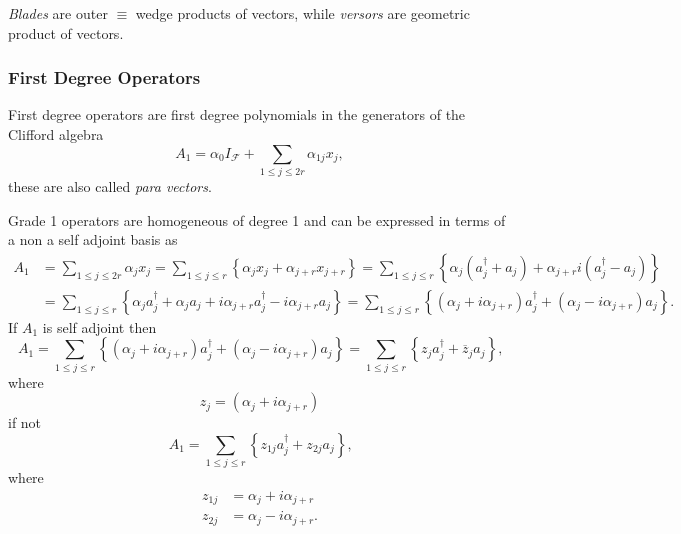 \documentclass[aps, preprint]{revtex4}
\begin{document}
\emph{Blades} are outer $ \equiv $ wedge products of vectors, while \emph{versors} are geometric product of vectors. 

\subsubsection{First Degree Operators}
First degree operators are first degree polynomials in the generators of the Clifford algebra
\begin{equation*}A_{1} =\alpha _{0} I_{\mathcal{F}} +\sum _{1 \leq j \leq 2 r}\alpha _{1 j} x_{j} ,
\end{equation*}these are also called \emph{para vectors}. 

Grade 1 operators are homogeneous of
degree 1 and can be expressed in terms of a non a self adjoint basis as
\begin{align}A_{1} &  =\sum _{1 \leq j \leq 2 r}\alpha _{j} x_{j} =\sum _{1 \leq j \leq r}\left \{\alpha _{j} x_{j} +\alpha _{j +r} x_{j +r}\right \} =\sum _{1 \leq j \leq r}\left \{\alpha _{j} \left (a_{j}^{ \dag } +a_{j}\right ) +\alpha _{j +r} i \left (a_{j}^{ \dag } -a_{j}\right )\right \} \nonumber  \\
 &  =\sum _{1 \leq j \leq r}\left \{\alpha _{j} a_{j}^{ \dag } +\alpha _{j} a_{j} +i \alpha _{j +r} a_{j}^{ \dag } -i \alpha _{j +r} a_{j}\right \} =\sum _{1 \leq j \leq r}\left \{\left (\alpha _{j} +i \alpha _{j +r}\right ) a_{j}^{ \dag } +\left (\alpha _{j} -i \alpha _{j +r}\right ) a_{j}\right \}\text{.}\end{align}If $A_{1}$ is self adjoint then
\begin{equation}A_{1} =\sum _{1 \leq j \leq r}\left \{\left (\alpha _{j} +i \alpha _{j +r}\right ) a_{j}^{ \dag } +\left (\alpha _{j} -i \alpha _{j +r}\right ) a_{j}\right \} =\sum _{1 \leq j \leq r}\left \{z_{j} a_{j}^{ \dag } +\overline{z}_{j} a_{j}\right \}\text{,}
\end{equation}where
\begin{equation}z_{j} =\left (\alpha _{j} +i \alpha _{j +r}\right )
\end{equation}if not
\begin{equation}A_{1} =\sum _{1 \leq j \leq r}\left \{z_{1 j} a_{j}^{ \dag } +z_{2 j} a_{j}\right \}\text{,}
\end{equation}where
\begin{align}z_{1 j} &  =\alpha _{j} +i \alpha _{j +r} \\
z_{2 j} &  =\alpha _{j} -i \alpha _{j +r}\text{.}\end{align}
\end{document}
